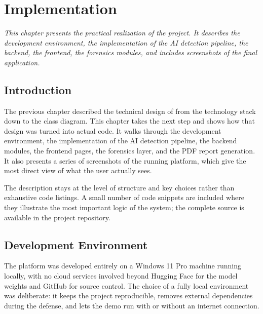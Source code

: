
\chapter{Implementation}
\label{chap:implementation}

\textit{This chapter presents the practical realization of the project. It describes the development environment, the implementation of the AI detection pipeline, the backend, the frontend, the forensics modules, and includes screenshots of the final application.}

\vspace{0.8cm}

\section{Introduction}

The previous chapter described the technical design of \deepguard{} from the technology stack down to the class diagram. This chapter takes the next step and shows how that design was turned into actual code. It walks through the development environment, the implementation of the AI detection pipeline, the backend modules, the frontend pages, the forensics layer, and the PDF report generation. It also presents a series of screenshots of the running platform, which give the most direct view of what the user actually sees.

The description stays at the level of structure and key choices rather than exhaustive code listings. A small number of code snippets are included where they illustrate the most important logic of the system; the complete source is available in the project repository.

\section{Development Environment}

The platform was developed entirely on a Windows 11 Pro machine running locally, with no cloud services involved beyond Hugging Face for the model weights and GitHub for source control. The choice of a fully local environment was deliberate: it keeps the project reproducible, removes external dependencies during the defense, and lets the demo run with or without an internet connection.

